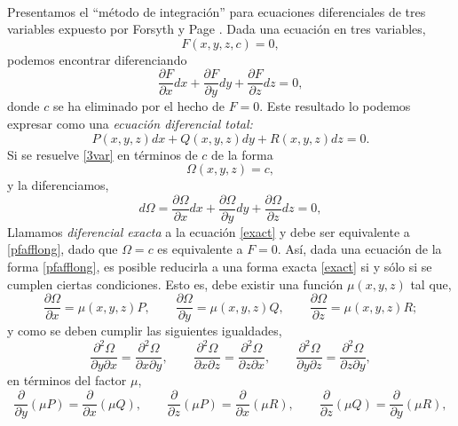 \documentclass{article}
\theoremstyle{definition} \newtheorem{defi}{Definici\'on}
\theoremstyle{definition} \newtheorem{teo}{Teorema}
\theoremstyle{definition} \newtheorem{cor}{Corolario}
\begin{document}
\paragraph{}
Presentamos el ``m\'etodo de integraci\'on'' para ecuaciones diferenciales de tres variables expuesto por Forsyth \cite{For} y Page \cite{PA}. Dada una ecuaci\'on en tres variables, 
\begin{equation}\label{3var}
F(x,y,z,c)=0,
\end{equation}
podemos encontrar diferenciando
$$\frac{\partial{F}}{\partial{x}}dx + \frac{\partial{F}}{\partial{y}}dy + \frac{\partial{F}}{\partial{z}}dz = 0,$$
donde $c$ se ha eliminado por el hecho de $F=0$. Este resultado lo podemos expresar como una \emph{ecuaci\'on diferencial total:}
\begin{equation}\label{pfafflong}
P(x,y,z)dx+Q(x,y,z)dy+R(x,y,z)dz=0.
\end{equation}
Si se resuelve \eqref{3var} en t\'erminos de $c$ de la forma
\begin{equation}\label{condition1}
\Omega(x,y,z)=c,
\end{equation}
y la diferenciamos,
\begin{equation}\label{exact}
d\Omega=\frac{\partial{\Omega}}{\partial{x}}dx + \frac{\partial{\Omega}}{\partial{y}}dy + \frac{\partial{\Omega}}{\partial{z}}dz = 0,
\end{equation}
Llamamos \emph{diferencial exacta} a la ecuaci\'on \eqref{exact} y debe ser equivalente a \eqref{pfafflong}, dado que $\Omega=c$ es equivalente a $F=0$. As\'i, dada una ecuaci\'on de la forma \eqref{pfafflong}, es posible reducirla a una forma exacta \eqref{exact} si y s\'olo si se cumplen ciertas condiciones. Esto es, debe existir una funci\'on $\mu(x,y,z)$ tal que,
\begin{equation}\label{factor}
\frac{\partial{\Omega}}{\partial{x}}=\mu(x,y,z)P,\qquad\frac{\partial{\Omega}}{\partial{y}}=\mu(x,y,z)Q,\qquad\frac{\partial{\Omega}}{\partial{z}}=\mu(x,y,z)R;
\end{equation} 
y como se deben cumplir las siguientes igualdades, 
\begin{equation*}
\frac{\partial^2{\Omega}}{\partial{y}\partial{x}}=\frac{\partial^2{\Omega}}{\partial{x}\partial{y}}, \qquad \frac{\partial^2{\Omega}}{\partial{x}\partial{z}}=\frac{\partial^2{\Omega}}{\partial{z}\partial{x}},\qquad \frac{\partial^2{\Omega}}{\partial{y}\partial{z}}=\frac{\partial^2{\Omega}}{\partial{z}\partial{y}},
\end{equation*}
en t\'erminos del factor $\mu$,
\begin{equation*}
\frac{\partial}{\partial{y}}(\mu P)=\frac{\partial}{\partial{x}}(\mu Q), \qquad \frac{\partial}{\partial{z}}(\mu P)=\frac{\partial}{\partial{x}}(\mu R), \qquad \frac{\partial}{\partial{z}}(\mu Q)=\frac{\partial}{\partial{y}}(\mu R),
\end{equation*}
\end{document}

